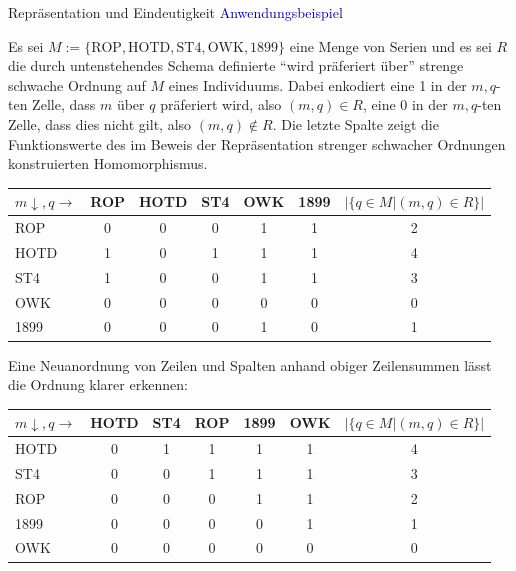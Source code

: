\documentclass[
  8pt,
  ignorenonframetext,
]{beamer}
\begin{document}
\begin{frame}{Repräsentation und Eindeutigkeit}
\protect\hypertarget{repruxe4sentation-und-eindeutigkeit-8}{}
\textcolor{darkblue}{Anwendungsbeispiel} \footnotesize

Es sei
\(M := \{\mbox{ROP},\mbox{HOTD},\mbox{ST4}, \mbox{OWK}, \mbox{1899}\}\)
eine Menge von Serien und es sei \(R\) die durch untenstehendes Schema
definierte ``wird präferiert über'' strenge schwache Ordnung auf \(M\)
eines Individuums. Dabei enkodiert eine 1 in der \(m,q\)-ten Zelle, dass
\(m\) über \(q\) präferiert wird, also \((m,q) \in R\), eine 0 in der
\(m,q\)-ten Zelle, dass dies nicht gilt, also \((m,q) \notin R\). Die
letzte Spalte zeigt die Funktionswerte des im Beweis der Repräsentation
strenger schwacher Ordnungen konstruierten Homomorphismus.

\vspace{1mm}
\tiny
\center
\begin{tabular}{l|ccccc|c}
$m \downarrow, q \rightarrow$ & ROP   & HOTD  & ST4   & OWK & 1899  & $|\{q \in M| (m,q) \in R \}|$ \\\hline
ROP                           & 0     & 0     & 0     & 1   & 1     & 2                             \\
HOTD                          & 1     & 0     & 1     & 1   & 1     & 4                             \\
ST4                           & 1     & 0     & 0     & 1   & 1     & 3                             \\
OWK                           & 0     & 0     & 0     & 0   & 0     & 0                             \\
1899                          & 0     & 0     & 0     & 1   & 0     & 1                             \\\hline
\end{tabular}

\footnotesize
\flushleft
\vspace{1mm}

Eine Neuanordnung von Zeilen und Spalten anhand obiger Zeilensummen
lässt die Ordnung klarer erkennen: \vspace{1mm}

\tiny
\center
\begin{tabular}{l|ccccc|c}
$m \downarrow, q \rightarrow$ & HOTD  & ST4   & ROP & 1899 & OWK  & $|\{q \in M| (m,q) \in R \}|$ \\\hline
HOTD                          & 0     & 1     & 1   & 1    & 1    & 4                             \\
ST4                           & 0     & 0     & 1   & 1    & 1    & 3                             \\
ROP                           & 0     & 0     & 0   & 1    & 1    & 2                             \\
1899                          & 0     & 0     & 0   & 0    & 1    & 1                             \\
OWK                           & 0     & 0     & 0   & 0    & 0    & 0                             \\\hline
\end{tabular}


\end{frame}
\end{document}
